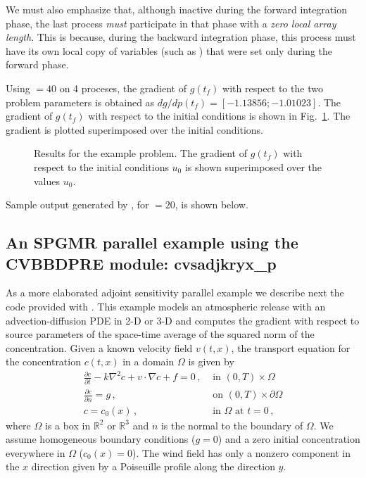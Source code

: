 We must also emphasize that, although inactive during the forward integration phase, 
the last process {\em must} participate in that phase with a 
{\em zero local array length}. 
This is because, during the backward integration phase, this process must
have its own local copy of variables (such as ) that were set
only during the forward phase.

Using  $=40$ on 4 proceses, the gradient of $g(t_f)$ with respect to 
the two problem parameters is obtained as $dg/dp(t_f) = [ -1.13856; -1.01023]$.
The gradient of $g(t_f)$ with respect to the initial conditions is shown in
Fig.~\ref{f:cvsadjnonx_p}. The gradient is plotted superimposed over the initial conditions.
\begin{figure}
  {\centerline{}}
  \caption{Results for the  example problem.
    The gradient of $g(t_f)$ with respect to the initial conditions $u_0$ 
    is shown superimposed over the values $u_0$.}
  \label{f:cvsadjnonx_p}
\end{figure}
Sample output generated by , for  $=20$, is shown below.



\newpage
\subsection{An SPGMR parallel example using the CVBBDPRE module: cvsadjkryx\_p}
\label{ss:cvsadjkryx_p}

As a more elaborated adjoint sensitivity parallel example we describe next
the  code provided with {\cvodes}. This example models an atmospheric 
release with an advection-diffusion PDE in 2-D or 3-D and computes the gradient 
with respect to source parameters of the space-time average of the squared norm
of the concentration.
Given a known velocity field $v(t,x)$, the transport equation for
the concentration $c(t,x)$ in a domain $\Omega$ is given by
\begin{equation}\label{e:cvsadjkryx_p_PDE}
  \begin{split}
    \frac{\partial c}{\partial t} - k \nabla^2 c + v \cdot \nabla c + f = 0 \, , 
    &\text{ in } (0,T) \times \Omega \\
    \frac{\partial c}{\partial n} = g \, ,
    &\text{ on } (0,T) \times \partial\Omega \\
    c = c_0(x) \, ,
    &\text{ in } \Omega \text{ at } t = 0 \, ,
  \end{split}
\end{equation}
where $\Omega$ is a box in ${\mathbb{R}}^2$ or ${\mathbb{R}}^3$ and $n$ is the 
normal to the boundary of $\Omega$.
We assume homogeneous boundary conditions ($g = 0$) and a zero initial
concentration everywhere in $\Omega$ ($c_0(x) = 0$). The wind field has only a
nonzero component in the $x$ direction given by a Poiseuille profile along the 
direction $y$.

